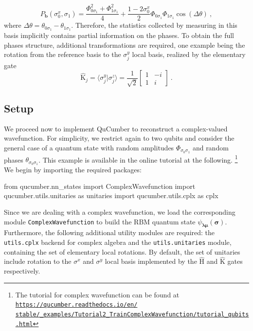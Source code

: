 \documentclass[submission, Phys, hidelnks]{SciPost}
\begin{document}
\begin{equation}
    P_{\bm{b}}(\sigma_0^x,\sigma_1)=\frac{\Phi_{0\sigma_1}^2+\Phi_{1\sigma_1}^2}{4}+\frac{1-2\sigma_0^x}{2}\Phi_{0\sigma_1}\Phi_{1\sigma_1}\cos(\Delta\theta)\:,
\end{equation}
where $\Delta\theta=\theta_{0\sigma_1}-\theta_{1\sigma_1}$. Therefore, the statistics collected by measuring in this basis implicitly contains partial information on the phases. To obtain the full phases structure, additional transformations are required, one example being the rotation from the reference basis to the $\sigma^y_j$ local basis, realized by
the elementary gate
\begin{equation}
        \hat{\mathrm{K}}_j=\langle\sigma_j^y|\sigma_j^z\rangle=\frac{1}{\sqrt{2}}\begin{bmatrix}1 & -i\\
    1 & i
\end{bmatrix}\:.
\end{equation}


\subsection{Setup}
We proceed now to implement QuCumber to reconstruct a complex-valued wavefunction. For simplicity, we restrict again to two qubits and consider the general case of a quantum state with random amplitudes $\Phi_{\sigma_0\sigma_1}$ and random phases $\theta_{\sigma_0\sigma_1}$. This example is available in the online tutorial at the following.
\footnote{The tutorial for complex wavefunction can be found at
            \href{https://qucumber.readthedocs.io/en/stable/\_examples/Tutorial2_TrainComplexWavefunction/tutorial_qubits.html
        }{\texttt{https://qucumber.readthedocs.io/en/\\stable/\_examples/Tutorial2\_TrainComplexWavefunction/tutorial\_qubits.html}}
}
We begin by importing the required packages:

\begin{python}
from qucumber.nn_states import ComplexWavefunction
import qucumber.utils.unitaries as unitaries
import qucumber.utils.cplx as cplx
\end{python}
Since we are dealing with a complex wavefunction, we load the corresponding module 
\verb|ComplexWavefunction| to build the RBM quantum state $\psi_{\bm{\lambda\mu}}(\bm{\sigma})$. Furthermore, the following additional utility modules are required: the \verb|utils.cplx| backend for complex algebra and the \verb|utils.unitaries| module, containing the set of elementary local rotations. By default, the set of unitaries include rotation to the $\sigma^x$ and $\sigma^y$ local basis implemented by the $\hat{\mathrm{H}}$ and $\hat{\mathrm{K}}$ gates respectively.
\end{document}
